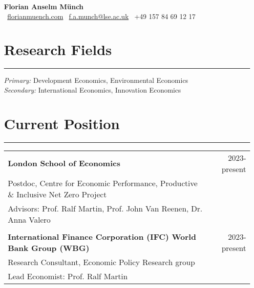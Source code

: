 \documentclass[10pt,a4paper]{article}
\begin{document}
\begin{center}
    \textbf{\LARGE Florian Anselm Münch} \\
    \faGlobe \ \href{https://florianmuench.com}{florianmuench.com} \hspace{1mm}
    \faEnvelope \ \href{mailto:f.a.munch@lse.ac.uk}{f.a.munch@lse.ac.uk} \hspace{1mm}
    \faPhone \ +49 157 84 69 12 17 \\
\end{center}


\section*{Research Fields}
\hrule
\vspace{1mm}
\textit{Primary:} Development Economics, Environmental Economics \\
\textit{Secondary:} International Economics, Innovation Economics

\section*{Current Position}
\hrule
\vspace{1mm}

\begin{tabularx}{\textwidth}{@{}Xr@{}}
\textbf{London School of Economics} & \hfill 2023-present  \\
Postdoc, Centre for Economic Performance, Productive \& Inclusive Net Zero Project & \\
Advisors: Prof. Ralf Martin, Prof. John Van Reenen, Dr. Anna Valero & \\
\\ 
\textbf{International Finance Corporation (IFC) World Bank Group (WBG)} & \hfill 2023-present  \\
Research Consultant, Economic Policy Research group & \\
Lead Economist: Prof. Ralf Martin & \\
\end{tabularx}

\end{document}
